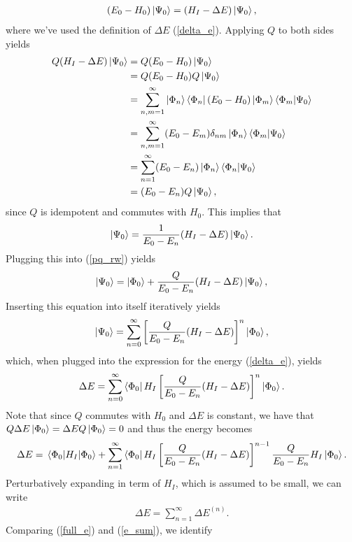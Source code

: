 \documentclass[Dual]{msu-thesis}
\begin{document}
\begin{align}
(E_0-H_0)\ket{\Psi_0}=(H_I-\Delta E)\ket{\Psi_0},
\end{align}
where we've used the definition of $\Delta E$ (\ref{delta_e}). Applying $Q$ to both sides yields
\begin{align}
Q(H_I-\Delta E)\ket{\Psi_0}
&=
Q(E_0-H_0)\ket{\Psi_0}
\\
&=
Q(E_0-H_0)Q\ket{\Psi_0}
\\
&=
\sum_{n,m=1}^\infty\ket{\Phi_n}\bra{\Phi_n}(E_0-H_0)\ket{\Phi_m}\bra{\Phi_m}\ket{\Psi_0}
\\
&=
\sum_{n,m=1}^\infty(E_0-E_m)\delta_{nm}\ket{\Phi_n}\bra{\Phi_m}\ket{\Psi_0}
\\
&=
\sum_{n=1}^\infty(E_0-E_n)\ket{\Phi_n}\bra{\Phi_n}\ket{\Psi_0}
\\
&=
(E_0-E_n)Q\ket{\Psi_0},
\end{align}
since $Q$ is idempotent and commutes with $H_0$. This implies that
\begin{align}
\ket{\Psi_0}=\frac{1}{E_0-E_n}(H_I-\Delta E)\ket{\Psi_0}.
\end{align}
Plugging this into (\ref{pq_rw}) yields
\begin{align}
\ket{\Psi_0}=\ket{\Phi_0} + \frac{Q}{E_0-E_n}(H_I-\Delta E)\ket{\Psi_0}, 
\end{align}
Inserting this equation into itself iteratively yields
\begin{align}
\ket{\Psi_0}
=
\sum_{n=0}^\infty\left[\frac{Q}{E_0-E_n}(H_I-\Delta E)\right]^n\ket{\Phi_0},
\end{align}
which, when plugged into the expression for the energy (\ref{delta_e}), yields
\begin{align}
\Delta E
=
\sum_{n=0}^\infty\bra{\Phi_0}H_I\left[\frac{Q}{E_0-E_n}(H_I-\Delta E)\right]^n\ket{\Phi_0}.
\end{align}
Note that since $Q$ commutes with $H_0$ and $\Delta E$ is constant, we have that $Q\Delta E\ket{\Phi_0}=\Delta EQ\ket{\Phi_0}=0$ and thus the energy becomes
\begin{align}
\label{full_e}
\Delta E
=
\mel{\Phi_0}{H_I}{\Phi_0}+
\sum_{n=1}^\infty\bra{\Phi_0}H_I\left[\frac{Q}{E_0-E_n}(H_I-\Delta E)\right]^{n-1}\frac{Q}{E_0-E_n}H_I\ket{\Phi_0}.
\end{align}
Perturbatively expanding in term of $H_I$, which is assumed to be small, we can write
\begin{align}
\label{e_sum}
\Delta E=\sum_{n=1}^\infty \Delta E^{(n)}.
\end{align}
Comparing (\ref{full_e}) and (\ref{e_sum}), we identify
\end{document}
